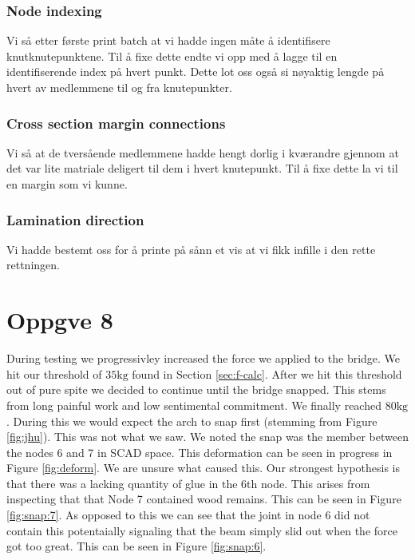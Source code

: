 \documentclass{report}
\begin{document}
\subsubsection {Node indexing}

Vi så etter første print batch at vi hadde ingen måte å identifisere knutknutepunktene. Til å fixe dette endte vi opp med å lagge til en identifiserende index på hvert punkt. Dette lot oss også si nøyaktig lengde på hvert av medlemmene til og fra knutepunkter.

\subsubsection {Cross section margin connections}

Vi så at de tversående medlemmene hadde hengt dorlig i kværandre gjennom at det var lite matriale deligert til dem i hvert knutepunkt. Til å fixe dette la vi til en margin som vi kunne.

\subsubsection {Lamination direction}

Vi hadde bestemt oss for å printe på sånn et vis at vi fikk infille i den rette rettningen.

\section{Oppgve 8}

During testing we progressivley increased the force we applied to the bridge. We hit our threshold of $35\mathrm{kg}$ found in Section \ref{sec:f-calc}. After we hit this threshold out of pure spite we decided to continue until the bridge snapped. This stems from long painful work and low sentimental commitment. We finally reached $80\mathrm{kg}$. During this we would expect the arch to snap first (stemming from Figure \ref{fig:jhu}). This was not what we saw. We noted the snap was the member between the nodes 6 and 7 in SCAD space. This deformation can be seen in progress in Figure \ref{fig:deform}. We are unsure what caused this. Our strongest hypothesis is that there was a lacking quantity of glue in the 6th node. This arises from inspecting that that Node 7 contained wood remains. This can be seen in Figure \ref{fig:snap:7}. As opposed to this we can see that the joint in node 6 did not contain this potentaially signaling that the beam simply slid out when the force got too great. This can be seen in Figure \ref{fig:snap:6}.
\end{document}
